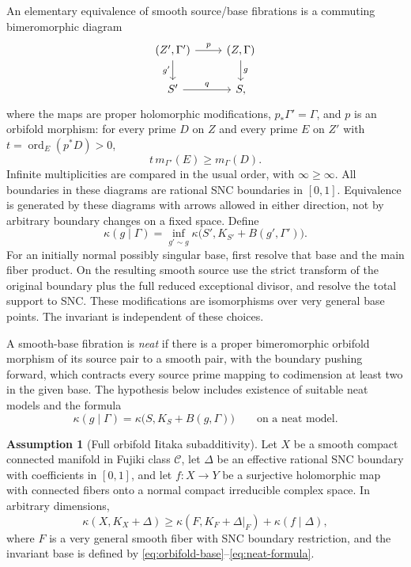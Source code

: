 \documentclass[11pt,letterpaper]{article}
\DeclareMathOperator{\ord}{ord}
\theoremstyle{definition}
\newtheorem{assumption}[theorem]{Assumption}
\theoremstyle{remark}
\begin{document}
An elementary equivalence of smooth source/base fibrations is a
commuting bimeromorphic diagram
\[
\begin{tikzcd}
 (Z',\Gamma')\arrow[r,"p"]\arrow[d,"g'"']&
 (Z,\Gamma)\arrow[d,"g"]\\
 S'\arrow[r,"q"]&S,
\end{tikzcd}
\]
where the maps are proper holomorphic modifications,
\(p_*\Gamma'=\Gamma\), and \(p\) is an orbifold morphism: for
every prime \(D\) on \(Z\) and every prime \(E\) on \(Z'\) with
\(t=\ord_E(p^*D)>0\),
\begin{equation}\label{eq:orbifold-morphism}
 t\,m_{\Gamma'}(E)\ge m_\Gamma(D).
\end{equation}
Infinite multiplicities are compared in the usual order, with
\(\infty\ge\infty\). All boundaries in these diagrams are rational
SNC boundaries in \([0,1]\). Equivalence is generated by these
diagrams with arrows allowed in either direction, not by arbitrary
boundary changes on a fixed space. Define
\begin{equation}\label{eq:orbifold-invariant}
 \kappa(g\mid\Gamma)=
 \inf_{g'\sim g}\kappa\bigl(S',K_{S'}+B(g',\Gamma')\bigr).
\end{equation}
For an initially normal possibly singular base, first resolve that
base and the main fiber product. On the resulting smooth source use
the strict transform of the original boundary plus the full reduced
exceptional divisor, and resolve the total support to SNC. These
modifications are isomorphisms over very general base points. The
invariant is independent of these choices.

A smooth-base fibration is \emph{neat} if there is a proper
bimeromorphic orbifold morphism of its source pair to a smooth pair,
with the boundary pushing forward, which contracts every source prime
mapping to codimension at least two in the given base. The hypothesis
below includes existence of suitable neat models and the formula
\begin{equation}\label{eq:neat-formula}
 \kappa(g\mid\Gamma)=\kappa\bigl(S,K_S+B(g,\Gamma)\bigr)
 \qquad\text{on a neat model}.
\end{equation}

\begin{assumption}[Full orbifold Iitaka subadditivity]
\label{hyp:campana}
Let \(X\) be a smooth compact connected manifold in Fujiki class
\(\mathcal C\), let \(\Delta\) be an effective rational SNC
boundary with coefficients in \([0,1]\), and let \(f:X\to Y\) be
a surjective holomorphic map with connected fibers onto a normal
compact irreducible complex space. In arbitrary dimensions,
\begin{equation}\label{eq:campana}
 \kappa(X,K_X+\Delta)\ge
 \kappa(F,K_F+\Delta|_F)+\kappa(f\mid\Delta),
\end{equation}
where \(F\) is a very general smooth fiber with SNC boundary
restriction, and the invariant base is defined by
\eqref{eq:orbifold-base}--\eqref{eq:neat-formula}.
\end{assumption}
\end{document}
